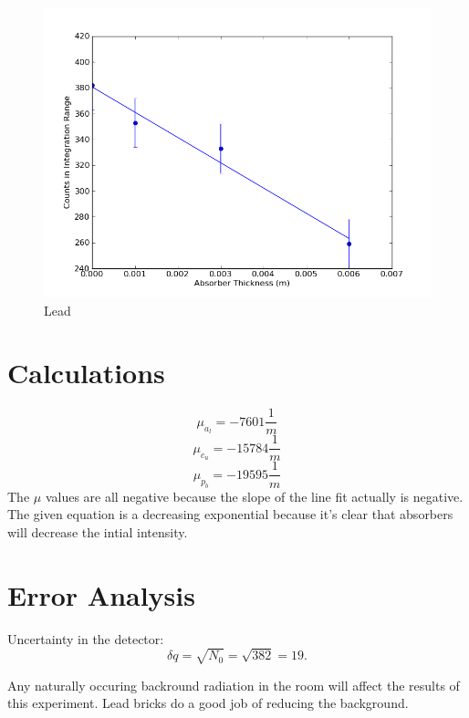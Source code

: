 \documentclass[12pt]{article}
\begin{document}
\begin{figure}[H]
\centering
\hspace{-0.0in}\includegraphics[scale=0.60]{Plot5.png}
\caption{Lead \label{fig:setup}}
\end{figure}

\section{Calculations}
\[\mu_a_l = -7601 \frac{1}{m} \]
\[\mu_c_u = -15784 \frac{1}{m} \]
\[\mu_p_b = -19595 \frac{1}{m} \]
\indent The $\mu$ values are all negative because the slope of the line fit actually is negative. The given equation is a decreasing exponential because it's clear that absorbers will decrease the intial intensity.

\section{Error Analysis}
\indent \indent Uncertainty in the detector:
\[\delta q = \sqrt{N_0} = \sqrt{382} = 19 . \]

\indent Any naturally occuring backround radiation in the room will affect the results of this experiment. Lead bricks do a good job of reducing the background.
\end{document}
